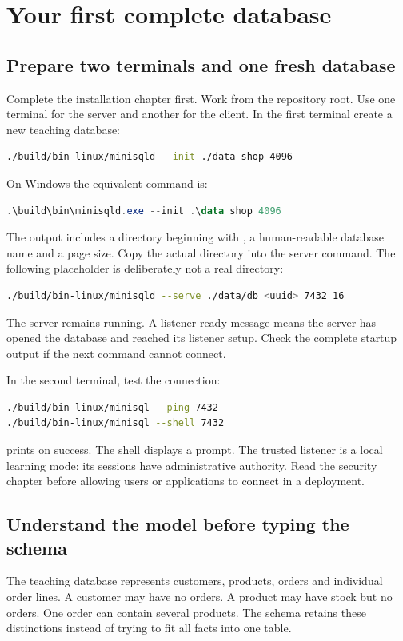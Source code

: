 \chapter{Your first complete database}
\label{learn:tutorial}

\section{Prepare two terminals and one fresh database}
Complete the installation chapter first. Work from the repository root. Use
one terminal for the server and another for the client. In the first terminal
create a new teaching database:
\begin{lstlisting}[language=bash]
./build/bin-linux/minisqld --init ./data shop 4096
\end{lstlisting}
On Windows the equivalent command is:
\begin{lstlisting}[language=PowerShell]
.\build\bin\minisqld.exe --init .\data shop 4096
\end{lstlisting}
The output includes a directory beginning with , a human-readable
database name and a page size. Copy the actual directory into the server
command. The following placeholder is deliberately not a real directory:
\begin{lstlisting}[language=bash]
./build/bin-linux/minisqld --serve ./data/db_<uuid> 7432 16
\end{lstlisting}
The server remains running. A listener-ready message means the server has
opened the database and reached its listener setup. Check the complete
startup output if the next command cannot connect.

In the second terminal, test the connection:
\begin{lstlisting}[language=bash]
./build/bin-linux/minisql --ping 7432
./build/bin-linux/minisql --shell 7432
\end{lstlisting}
 prints  on success. The shell displays a
 prompt. The trusted listener is a local learning mode: its
sessions have administrative authority. Read the security chapter before
allowing users or applications to connect in a deployment.

\section{Understand the model before typing the schema}
The teaching database represents customers, products, orders and individual
order lines. A customer may have no orders. A product may have stock but no
orders. One order can contain several products. The schema retains these
distinctions instead of trying to fit all facts into one table.


